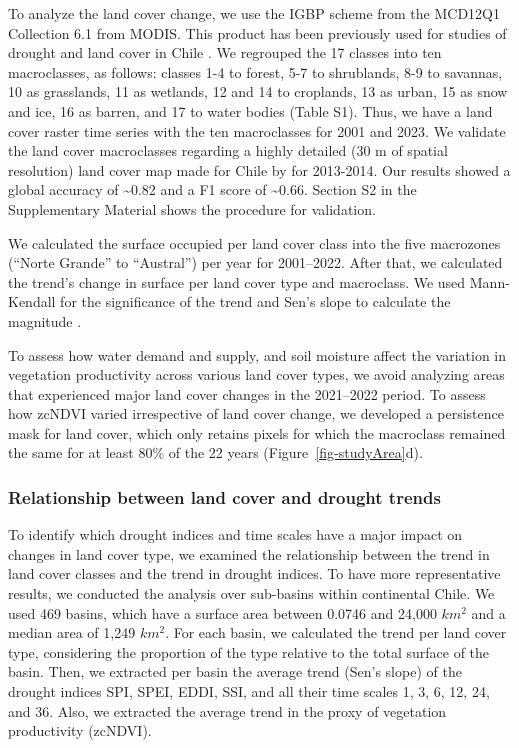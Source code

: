 \documentclass[
  authoryear,
  preprint,
  3p,
  onecolumn]{elsarticle}
\begin{document}
To analyze the land cover change, we use the IGBP scheme from the
MCD12Q1 Collection 6.1 from MODIS. This product has been previously used
for studies of drought and land cover in Chile
\citep{Fuentes2021, Zambrano2018}. We regrouped the 17 classes into ten
macroclasses, as follows: classes 1-4 to forest, 5-7 to shrublands, 8-9
to savannas, 10 as grasslands, 11 as wetlands, 12 and 14 to croplands,
13 as urban, 15 as snow and ice, 16 as barren, and 17 to water bodies
(Table S1). Thus, we have a land cover raster time series with the ten
macroclasses for 2001 and 2023. We validate the land cover macroclasses
regarding a highly detailed (30 m of spatial resolution) land cover map
made for Chile by \citet{Zhao2016} for 2013-2014. Our results showed a
global accuracy of \textasciitilde0.82 and a F1 score of
\textasciitilde0.66. Section S2 in the Supplementary Material shows the
procedure for validation.

We calculated the surface occupied per land cover class into the five
macrozones (``Norte Grande'' to ``Austral'') per year for 2001--2022.
After that, we calculated the trend's change in surface per land cover
type and macroclass. We used Mann-Kendall for the significance of the
trend \citep{Kendall1975} and Sen's slope to calculate the magnitude
\citep{Sen1968}.

To assess how water demand and supply, and soil moisture affect the
variation in vegetation productivity across various land cover types, we
avoid analyzing areas that experienced major land cover changes in the
2021--2022 period. To assess how zcNDVI varied irrespective of land
cover change, we developed a persistence mask for land cover, which only
retains pixels for which the macroclass remained the same for at least
80\% of the 22 years (Figure~\ref{fig-studyArea}d).

\subsubsection{Relationship between land cover and drought
trends}\label{relationship-between-land-cover-and-drought-trends}

To identify which drought indices and time scales have a major impact on
changes in land cover type, we examined the relationship between the
trend in land cover classes and the trend in drought indices. To have
more representative results, we conducted the analysis over sub-basins
within continental Chile. We used 469 basins, which have a surface area
between 0.0746 and 24,000 \(km^2\) and a median area of 1,249 \(km^2\).
For each basin, we calculated the trend per land cover type, considering
the proportion of the type relative to the total surface of the basin.
Then, we extracted per basin the average trend (Sen's slope) of the
drought indices SPI, SPEI, EDDI, SSI, and all their time scales 1, 3, 6,
12, 24, and 36. Also, we extracted the average trend in the proxy of
vegetation productivity (zcNDVI).
\end{document}
